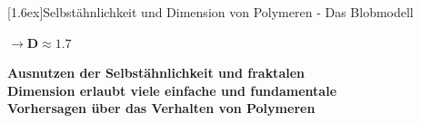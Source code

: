 \documentclass[final]{beamer}
\newlength{\columnheight}
\newlength{\marginw}
\newlength{\tw}
\newlength{\colw}
\newenvironment{myTwoColPoster}{%
  \begin{minipage}[t]{\textwidth}%
    \hspace*{\marginw}%
    \hspace*{9.5bp}%
    \begin{minipage}[t]{\tw}}%
  {\end{minipage}%
   \hspace*{\marginw}%
   \end{minipage}}
\newenvironment{myCol}%
    {\begin{minipage}[t][\columnheight][t]{\colw}}%
    {\end{minipage}}
\newenvironment{textblock}[1]%
    {\begin{block}{\rule[-0.6ex]{0pt}{2.4ex}\raisebox{-0.25ex}[1.6ex]{#1}}%
     \vspace*{5mm}}%
    {\vspace*{5mm}\end{block}}
\begin{document}
\begin{frame}[t]{}
\begin{myTwoColPoster}
\begin{myCol}
\begin{textblock}{Selbst\"ahnlichkeit und Dimension von Polymeren - Das Blobmodell}
\begin{minipage}[c]{0.48\textwidth}
\begin{flushleft}
        \end{flushleft}
      \centerline{ \large ${\boldsymbol{ \rightarrow D\approx1.7}}$}
      \end{minipage}
    \vspace*{4cm}
    \begin{center} \setlength{\baselineskip}{1.2em}
      \textcolor{IPForange}{\textbf{
         \LARGE 
         Ausnutzen der Selbst\"ahnlichkeit und fraktalen\\[0.8cm]
         Dimension erlaubt viele einfache und fundamentale\\[1cm]
         Vorhersagen \"uber das Verhalten von Polymeren} }
    \end{center}
   \end{textblock}


\end{myCol}%
\end{myTwoColPoster}
\end{frame}
\end{document}
